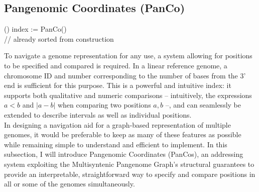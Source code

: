 \subsection*{Pangenomic Coordinates (PanCo)}
\begin{algorithm}[t]
	\Fn({}){}{
		index := PanCo()\\
		// already sorted from construction\\
	}
	\caption{\textbf{Pseudocode illustrating the GFA export of a MPG, using PanCo indexes as node IDs.}\\
	Note that we get the PanCo indexes »for free« from the ordering of the graph during construction.
	In the implementation, they are computed during graph construction; this was left out in Algorithm \ref{algo:mpg} for clarity.
	Here they are used as node IDs to make the GFA output easier to read.\\
	The most expensive step in this algorithm in practice is obtaining the genomic sequence at the required position, as this involves significant I/O.
	}
	\label{algo:gfa}
\end{algorithm}


To navigate a genome representation for any use, a system allowing for positions to be specified and compared is required.
In a linear reference genome, a chromosome ID and number corresponding to the number of bases from the 3' end is sufficient for this purpose.
This is a powerful and intuitive index: it supports both qualitative and numeric comparisons -- intuitively, the expressions $a < b$ and $|a - b|$ when comparing two positions $a,b$ --, and can seamlessly be extended to describe intervals as well as individual positions.\\
In designing a navigation aid for a graph-based representation of multiple genomes, it would be preferable to keep as many of these features as possible while remaining simple to understand and efficient to implement.
In this subsection, I will introduce Pangenomic Coordinates (PanCos), an addressing system exploiting the Multisyntenic Pangenome Graph's structural guarantees to provide an interpretable, straightforward way to specify and compare positions in all or some of the genomes simultaneously.

